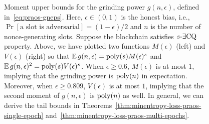 \begin{figure}[!htb]
\begin{minipage}{0.5 \textwidth}
  \end{minipage}
  \caption[Grinding power moment bounds for Praos]{
    Moment upper bounds for the grinding power $g(n,\epsilon)$, defined in~\eqref{eq:praos-gneps}.
    Here, $\epsilon \in (0,1)$ is the honest bias, i.e., $\Pr[\text{a slot is adversarial}] = (1-\epsilon)/2$ 
    and $n$ is the number of nonce-generating slots. 
    Suppose the blockchain satisfies ${s}\text{-}\exists\mathrm{CQ}$ property.
    Above, we have plotted two functions $M(\epsilon)$ (left) and $V(\epsilon)$ (right) so that 
    $\operatorname{\mathbb{E}} g(n,\epsilon) = \mathrm{poly}(s) M(\epsilon)^s$ and $\operatorname{\mathbb{E}} g(n,\epsilon)^2 = \mathrm{poly}(s) V(\epsilon)^s$. 
    When $\epsilon \geq 0.6$, $M(\epsilon)$ is at most $1$, 
    implying that the grinding power is $\mathrm{poly}(n)$ in expectation.
    Moreover, when $\epsilon \geq 0.809$, $V(\epsilon)$ is at most $1$, 
    implying that the second moment of $g(n, \epsilon)$ is $\mathrm{poly}(n)$ as well. 
    In general, we can derive the tail bounds in Theorems~\ref{thm:minentropy-loss-praos-single-epoch} 
    and~\ref{thm:minentropy-loss-praos-multi-epochs}.
  }
  \label{fig:praos-gp-moments}
\end{figure}
